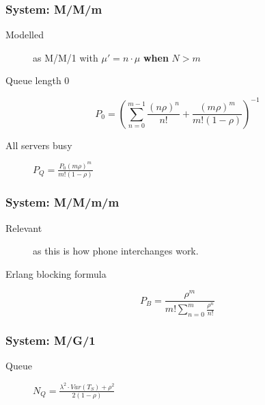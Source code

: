 \documentclass[landscape]{cheat}
\begin{document}
\begin{multicols*}{3}
\subsubsection{System: M/M/m}
\begin{description}
    \item[Modelled] as M/M/1 with $\mu' = n\cdot\mu$ \textbf{when} $N>m$
    \item[Queue length 0]
\end{description}
\begin{equation*}
    P_0 = \left(\sum_{n = 0}^{m-1}\frac {(n\rho)^n}{n!} + \frac {(m\rho)^m} {m!(1-\rho)} \right)^{-1}
\end{equation*}
\begin{description}
    \item[All servers busy] $P_Q = \frac{P_0 (m\rho)^m} {m!(1-\rho)}$
\end{description}

\subsubsection{System: M/M/m/m}
\begin{description}
    \item[Relevant] as this is how phone interchanges work.
    \item[Erlang blocking formula]
\end{description}
\begin{equation*}
    P_B = \frac{\rho^m}{m! \sum_{n=0}^m \frac{\rho^n}{n!}}
\end{equation*}

\subsubsection{System: M/G/1}
\begin{description}
    \item[Queue] $N_Q = \frac{\lambda^2 \cdot Var(T_S) + \rho^2} {2(1-\rho)}$
\end{description}

\end{multicols*}
\end{document}
